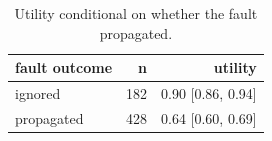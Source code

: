 \begin{table}[t]
\centering
\small
\begin{tabular}{lrr}
\toprule
fault outcome & n & utility \\
\midrule
ignored & 182 & 0.90 [0.86, 0.94] \\
propagated & 428 & 0.64 [0.60, 0.69] \\
\bottomrule
\end{tabular}
\caption{Utility conditional on whether the fault propagated.}
\label{tab:utility_by_outcome}
\end{table}
